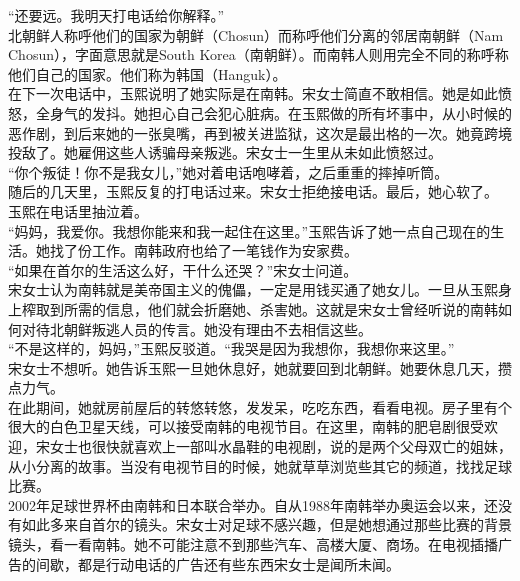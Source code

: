 “还要远。我明天打电话给你解释。”\\

北朝鲜人称呼他们的国家为朝鲜（Chosun）而称呼他们分离的邻居南朝鲜（Nam Chosun），字面意思就是South Korea（南朝鲜）。而南韩人则用完全不同的称呼称他们自己的国家。他们称为韩国（Hanguk）。\\

在下一次电话中，玉熙说明了她实际是在南韩。宋女士简直不敢相信。她是如此愤怒，全身气的发抖。她担心自己会犯心脏病。在玉熙做的所有坏事中，从小时候的恶作剧，到后来她的一张臭嘴，再到被关进监狱，这次是最出格的一次。她竟跨境投敌了。她雇佣这些人诱骗母亲叛逃。宋女士一生里从未如此愤怒过。\\

“你个叛徒！你不是我女儿，”她对着电话咆哮着，之后重重的摔掉听筒。\\

随后的几天里，玉熙反复的打电话过来。宋女士拒绝接电话。最后，她心软了。\\

玉熙在电话里抽泣着。\\

“妈妈，我爱你。我想你能来和我一起住在这里。”玉熙告诉了她一点自己现在的生活。她找了份工作。南韩政府也给了一笔钱作为安家费。\\

“如果在首尔的生活这么好，干什么还哭？”宋女士问道。\\

宋女士认为南韩就是美帝国主义的傀儡，一定是用钱买通了她女儿。一旦从玉熙身上榨取到所需的信息，他们就会折磨她、杀害她。这就是宋女士曾经听说的南韩如何对待北朝鲜叛逃人员的传言。她没有理由不去相信这些。\\

“不是这样的，妈妈，”玉熙反驳道。“我哭是因为我想你，我想你来这里。”\\

宋女士不想听。她告诉玉熙一旦她休息好，她就要回到北朝鲜。她要休息几天，攒点力气。\\

在此期间，她就房前屋后的转悠转悠，发发呆，吃吃东西，看看电视。房子里有个很大的白色卫星天线，可以接受南韩的电视节目。在这里，南韩的肥皂剧很受欢迎，宋女士也很快就喜欢上一部叫水晶鞋的电视剧，说的是两个父母双亡的姐妹，从小分离的故事。当没有电视节目的时候，她就草草浏览些其它的频道，找找足球比赛。\\

2002年足球世界杯由南韩和日本联合举办。自从1988年南韩举办奥运会以来，还没有如此多来自首尔的镜头。宋女士对足球不感兴趣，但是她想通过那些比赛的背景镜头，看一看南韩。她不可能注意不到那些汽车、高楼大厦、商场。在电视插播广告的间歇，都是行动电话的广告还有些东西宋女士是闻所未闻。\\

